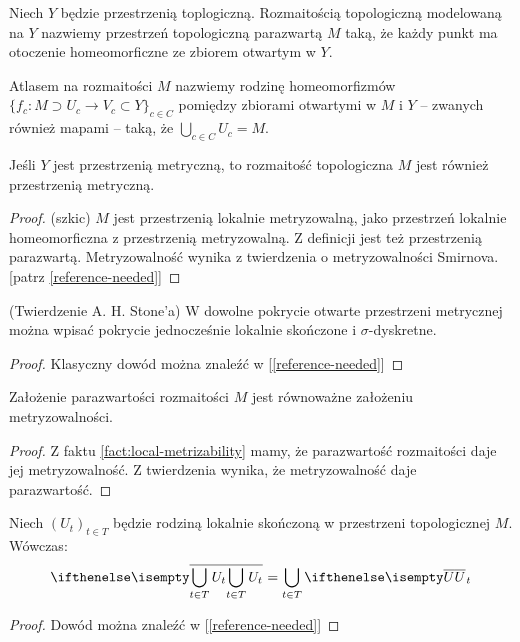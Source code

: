 \begin{df}
  Niech $Y$ będzie przestrzenią toplogiczną. Rozmaitością topologiczną modelowaną na $Y$ nazwiemy przestrzeń topologiczną parazwartą $M$ taką, że każdy punkt ma otoczenie homeomorficzne ze zbiorem otwartym w $Y$.
\end{df}

\begin{df}
  Atlasem na rozmaitości $M$ nazwiemy rodzinę homeomorfizmów $\{f_c : M \supset U_c \to V_c \subset Y\}_{c \in C}$ pomiędzy zbiorami otwartymi w $M$ i $Y$ -- zwanych również mapami -- taką, że $\bigcup_{c \in C} U_c = M$.
\end{df}


\begin{fact} \label{fact:local-metrizability}
  Jeśli $Y$ jest przestrzenią metryczną, to rozmaitość topologiczna $M$ jest również przestrzenią metryczną.
  \begin{proof}(szkic)
    $M$ jest przestrzenią lokalnie metryzowalną, jako przestrzeń lokalnie homeomorficzna z przestrzenią metryzowalną. Z definicji jest też przestrzenią parazwartą. Metryzowalność wynika z twierdzenia o metryzowalności Smirnova. [patrz \ref{reference-needed}]
  \end{proof}
\end{fact}

\begin{thm}(Twierdzenie A. H. Stone'a)
  \label{thm:stone}
  W dowolne pokrycie otwarte przestrzeni metrycznej można wpisać pokrycie jednocześnie lokalnie skończone i $\sigma$-dyskretne.
  \begin{proof}
    Klasyczny dowód można znaleźć w [\ref{reference-needed}]
  \end{proof}
\end{thm}

\begin{cor}
  Założenie parazwartości rozmaitości $M$ jest równoważne założeniu metryzowalności.
  \begin{proof}
    Z faktu \ref{fact:local-metrizability} mamy, że parazwartość rozmaitości daje jej metryzowalność. Z twierdzenia \label{thm:stone} wynika, że metryzowalność daje parazwartość.
  \end{proof}
\end{cor}

\begin{lem} \label{lem:cl-locally-finite-sum}
  Niech $(U_t)_{t \in T}$ będzie rodziną lokalnie skończoną w przestrzeni topologicznej $M$. Wówczas:
  \[
    \cl{\bigcup_{t \in T} U_t} = \bigcup_{t \in T} \cl U_t
  \]
  \begin{proof}
    Dowód można znaleźć w [\ref{reference-needed}]
  \end{proof}
\end{lem}


